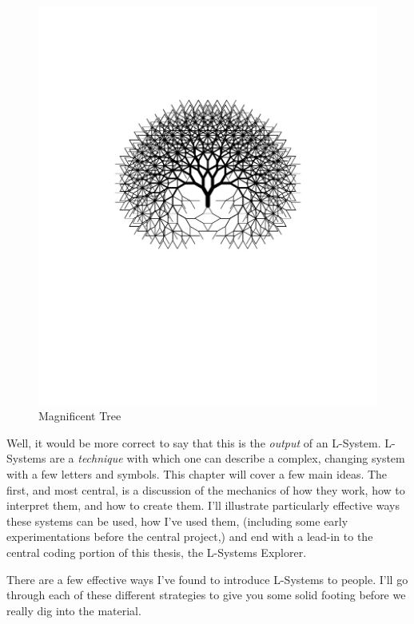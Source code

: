 \documentclass[12pt,twoside]{reedthesis}
\begin{document}
	\begin{figure}[h]
	\centering
	\includegraphics[clip=true, viewport=1in 4.6in 9in 9in, scale=0.45]{Images/WhatisanL-System1}
	\caption[Magnificent Tree]{Magnificent Tree\footnotemark}
	\label {Motivations3}
	\end{figure}

	Well, it would be more correct to say that this is the \textit{output} of an L-System. L-Systems are a \textit{technique} with which one can describe a complex, changing system with a few letters and symbols. This chapter will cover a few main ideas. The first, and most central, is a discussion of the mechanics of how they work, how to interpret them, and how to create them. I’ll illustrate particularly effective ways these systems can be used, how I’ve used them, (including some early experimentations before the central project,) and end with a lead-in to the central coding portion of this thesis, the L-Systems Explorer.

	There are a few effective ways I've found to introduce L-Systems to people. I'll go through each of these different strategies to give you some solid footing before we really dig into the material.
\end{document}

